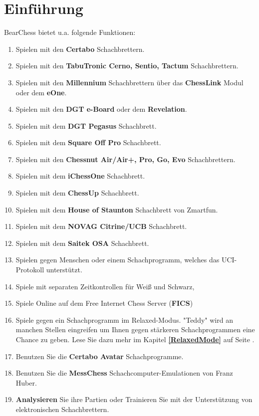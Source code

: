 \documentclass[11pt,a4paper]{article}
\begin{document}
	\section{Einführung}
	BearChess bietet u.a. folgende Funktionen:
	\begin{enumerate}
		\item Spielen mit den \textbf{Certabo} Schachbrettern.
		\item Spielen mit den \textbf{TabuTronic Cerno, Sentio, Tactum} Schachbrettern.
		\item Spielen mit den \textbf{Millennium} Schachbrettern über das \textbf{ChessLink} Modul oder dem \textbf{eOne}.
		\item Spielen mit den \textbf{DGT e-Board} oder dem \textbf{Revelation}.	  
		\item Spielen mit dem \textbf{DGT Pegasus} Schachbrett.
		\item Spielen mit dem \textbf{Square Off Pro} Schachbrett.
		\item Spielen mit den \textbf{Chessnut Air/Air+, Pro, Go, Evo} Schachbrettern. 
		\item Spielen mit dem \textbf{iChessOne} Schachbrett.
		\item Spielen mit dem \textbf{ChessUp} Schachbrett.
        \item Spielen mit dem \textbf{House of Staunton} Schachbrett von Zmartfun.
		\item Spielen mit dem \textbf{NOVAG Citrine/UCB} Schachbrett.
		\item Spielen mit dem \textbf{Saitek OSA} Schachbrett.  
		\item Spielen gegen Menschen oder einem Schachprogramm, welches das UCI-Protokoll unterstützt.
		\item Spiele mit separaten Zeitkontrollen für Weiß und Schwarz,
		\item Spiele Online auf dem Free Internet Chess Server (\textbf{FICS})
		\item Spiele gegen ein Schachprogramm im Relaxed-Modus. "Teddy" wird an manchen Stellen eingreifen um Ihnen gegen stärkeren Schachprogrammen eine Chance zu geben. Lese Sie dazu mehr im Kapitel \textbf{\ref{RelaxedMode}  } auf Seite \pageref{RelaxedMode}.  	  
		\item Benutzen Sie die \textbf{Certabo Avatar} Schachprogramme.
		\item Benutzen Sie die \textbf{MessChess} Schachcomputer-Emulationen von Franz Huber.  	    	  
		\item \textbf{Analysieren} Sie ihre Partien oder Trainieren Sie mit der Unterstützung von elektronischen Schachbrettern.

\end{enumerate}
\end{document}
